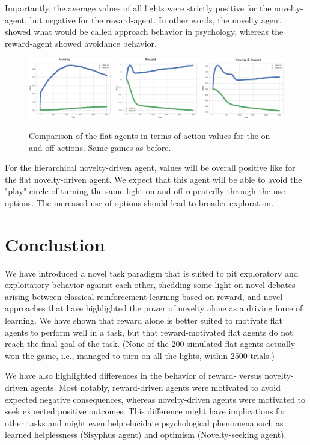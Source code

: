 \documentclass{article}
\begin{document}
Importantly, the average values of all lights were strictly positive for the novelty-agent, but negative for the reward-agent. In other words, the novelty agent showed what would be called approach behavior in psychology, whereas the reward-agent showed avoidance behavior. 

\begin{figure}[h]
  \centering
  \includegraphics[width=\linewidth]{NIPSfigures/VFlat.png}
  \label{ResultsFlat}
  \caption{Comparison of the flat agents in terms of action-values for the on- and off-actions. Same games as before.}
\end{figure}

For the hierarchical novelty-driven agent, values will be overall positive like for the flat novelty-driven agent. We expect that this agent will be able to avoid the "play"-circle of turning the same light on and off repeatedly through the use options. The increased use of options should lead to broader exploration.


\section{Conclustion}

We have introduced a novel task paradigm that is suited to pit exploratory and exploitatory behavior against each other, shedding some light on novel debates arising between classical reinforcement learning based on reward, and novel approaches that have highlighted the power of novelty alone as a driving force of learning. We have shown that reward alone is better suited to motivate flat agents to perform well in a task, but that reward-motivated flat agents do not reach the final goal of the task. (None of the 200 simulated flat agents actually won the game, i.e., managed to turn on all the lights, within 2500 trials.)

We have also highlighted differences in the behavior of reward- versus novelty-driven agents. Most notably, reward-driven agents were motivated to avoid expected negative consequences, whereas novelty-driven agents were motivated to seek expected positive outcomes. This difference might have implications for other tasks and might even help elucidate psychological phenomena such as learned helplessness (Sisyphus agent) and optimism (Novelty-seeking agent). 
\end{document}
